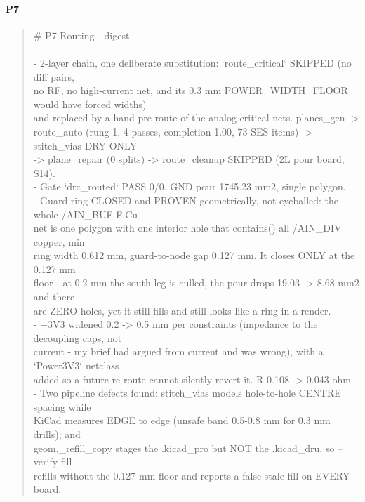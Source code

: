 \documentclass[11pt,a4paper]{article}
\begin{document}
\paragraph*{P7}
\begin{quote}\small\ttfamily\raggedright
\# P7 Routing - digest\\
~\\
- 2-layer chain, one deliberate substitution: `route\_critical` SKIPPED (no diff pairs,\\
  no RF, no high-current net, and its 0.3 mm POWER\_WIDTH\_FLOOR would have forced widths)\\
  and replaced by a hand pre-route of the analog-critical nets. planes\_gen -\textgreater{}\\
  route\_auto (rung 1, 4 passes, completion 1.00, 73 SES items) -\textgreater{} stitch\_vias DRY ONLY\\
  -\textgreater{} plane\_repair (0 splits) -\textgreater{} route\_cleanup SKIPPED (2L pour board, S14).\\
- Gate `drc\_routed` PASS 0/0. GND pour 1745.23 mm2, single polygon.\\
- Guard ring CLOSED and PROVEN geometrically, not eyeballed: the whole /AIN\_BUF F.Cu\\
  net is one polygon with one interior hole that contains() all /AIN\_DIV copper, min\\
  ring width 0.612 mm, guard-to-node gap 0.127 mm. It closes ONLY at the 0.127 mm\\
  floor - at 0.2 mm the south leg is culled, the pour drops 19.03 -\textgreater{} 8.68 mm2 and there\\
  are ZERO holes, yet it still fills and still looks like a ring in a render.\\
- +3V3 widened 0.2 -\textgreater{} 0.5 mm per constraints (impedance to the decoupling caps, not\\
  current - my brief had argued from current and was wrong), with a `Power3V3` netclass\\
  added so a future re-route cannot silently revert it. R 0.108 -\textgreater{} 0.043 ohm.\\
- Two pipeline defects found: stitch\_vias models hole-to-hole CENTRE spacing while\\
  KiCad measures EDGE to edge (unsafe band 0.5-0.8 mm for 0.3 mm drills); and\\
  geom.\_refill\_copy stages the .kicad\_pro but NOT the .kicad\_dru, so --verify-fill\\
  refills without the 0.127 mm floor and reports a false stale fill on EVERY board.
\end{quote}
\end{document}
